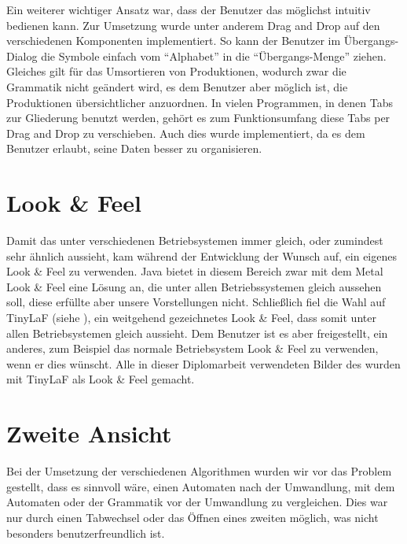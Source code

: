 Ein weiterer wichtiger Ansatz war, dass der Benutzer das \gtitool möglichst
intuitiv bedienen kann. Zur Umsetzung wurde unter anderem Drag and Drop auf den
verschiedenen Komponenten implementiert. So kann der Benutzer im Übergangs-Dialog
die Symbole einfach vom "`Alphabet"' in die "`Übergangs-Menge"' ziehen. Gleiches
gilt für das Umsortieren von Produktionen, wodurch zwar die Grammatik nicht
geändert wird, es dem Benutzer aber möglich ist, die Produktionen übersichtlicher
anzuordnen. In vielen Programmen, in denen Tabs zur Gliederung benutzt werden,
gehört es zum Funktionsumfang diese Tabs per Drag and Drop zu verschieben. Auch
dies wurde implementiert, da es dem Benutzer erlaubt, seine Daten besser zu
organisieren.\vspace{10pt}


\section{Look \& Feel}\label{LookAndFeel}

Damit das \gtitool unter verschiedenen Betriebsystemen immer gleich, oder
zumindest sehr ähnlich aussieht, kam während der Entwicklung der Wunsch auf, ein
eigenes Look \& Feel zu verwenden. Java bietet in diesem Bereich zwar mit dem
Metal Look \& Feel eine Lösung an, die unter allen Betriebssystemen gleich
aussehen soll, diese erfüllte aber unsere Vorstellungen nicht. Schließlich fiel
die Wahl auf TinyLaF (siehe \cite{tinylaf}), ein weitgehend gezeichnetes
Look \& Feel, dass somit unter allen Betriebsystemen gleich aussieht. Dem
Benutzer ist es aber freigestellt, ein anderes, zum Beispiel das normale
Betriebsystem Look \& Feel zu verwenden, wenn er dies wünscht. Alle in dieser
Diplomarbeit verwendeten Bilder des \gtitools wurden mit TinyLaF als Look \&
Feel gemacht.\vspace{10pt}


\section{Zweite Ansicht}\label{SecondView}

Bei der Umsetzung der verschiedenen Algorithmen wurden wir vor das Problem
gestellt, dass es sinnvoll wäre, einen Automaten nach der Umwandlung, mit dem
Automaten oder der Grammatik vor der Umwandlung zu vergleichen. Dies war nur
durch einen Tabwechsel oder das Öffnen eines zweiten \gtitools möglich, was
nicht besonders benutzerfreundlich ist.\vspace{10pt}


